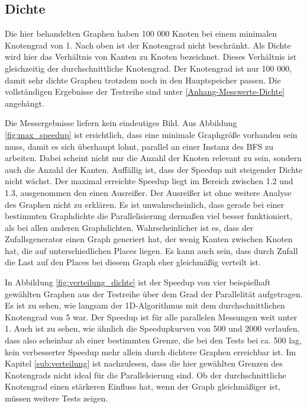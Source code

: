 \subsection{Dichte} %
\label{sub:dichte}
Die hier behandelten Graphen haben 100 000 Knoten bei einem minimalen Knotengrad von 1. Nach oben ist der Knotengrad nicht beschränkt. Als Dichte wird hier das Verhältnis von Kanten zu Knoten bezeichnet. Dieses Verhältnis ist gleichzeitig der durchschnittliche Knotengrad. Der Knotengrad ist nur 100 000, damit sehr dichte Graphen trotzdem noch in den Hauptspeicher passen. Die vollständigen Ergebnisse der Testreihe sind unter \ref{Anhang-Messwerte-Dichte} angehängt.

Die Messergebnisse liefern kein eindeutiges Bild. Aus Abbildung \ref{fig:max_speedup} ist ersichtlich, dass eine minimale Graphgröße vorhanden sein muss, damit es sich überhaupt lohnt, parallel an einer Instanz des BFS zu arbeiten. Dabei scheint nicht nur die Anzahl der Knoten relevant zu sein, sondern auch die Anzahl der Kanten. Auffällig ist, dass der Speedup mit steigender Dichte nicht wächst. Der maximal erreichte Speedup liegt im Bereich zwischen 1.2 und 1.3, ausgenommen den einen Ausreißer. Der Ausreißer ist ohne weitere Analyse des Graphen nicht zu erklären. Es ist unwahrscheinlich, dass gerade bei einer bestimmten Graphdichte die Parallelisierung dermaßen viel besser funktioniert, als bei allen anderen Graphdichten. Wahrscheinlicher ist es, dass der Zufallsgenerator einen Graph generiert hat, der wenig Kanten zwischen Knoten hat, die auf unterschiedlichen Places liegen. Es kann auch sein, dass durch Zufall die Last auf den Places bei diesem Graph eher gleichmäßig verteilt ist. 

In Abbildung \ref{fig:verteilung_dichte} ist der Speedup von vier beispielhaft gewählten Graphen aus der Testreihe über dem Grad der Parallelität aufgetragen. Es ist zu sehen, wie langsam der 1D-Algorithmus mit dem durchschnittlichen Knotengrad von 5 war. Der Speedup ist für alle parallelen Messungen weit unter 1. Auch ist zu sehen, wie ähnlich die Speedupkurven von 500 und 2000 verlaufen, dass also scheinbar ab einer bestimmten Grenze, die bei den Tests bei ca. 500 lag, kein verbesserter Speedup mehr allein durch dichtere Graphen erreichbar ist. Im Kapitel \ref{sub:verteilung} ist nachzulesen, dass die hier gewählten Grenzen des Knotengrads nicht ideal für die Parallelsierung sind. Ob der durchschnittliche Knotengrad einen stärkeren Einfluss hat, wenn der Graph gleichmäßiger ist, müssen weitere Tests zeigen.

